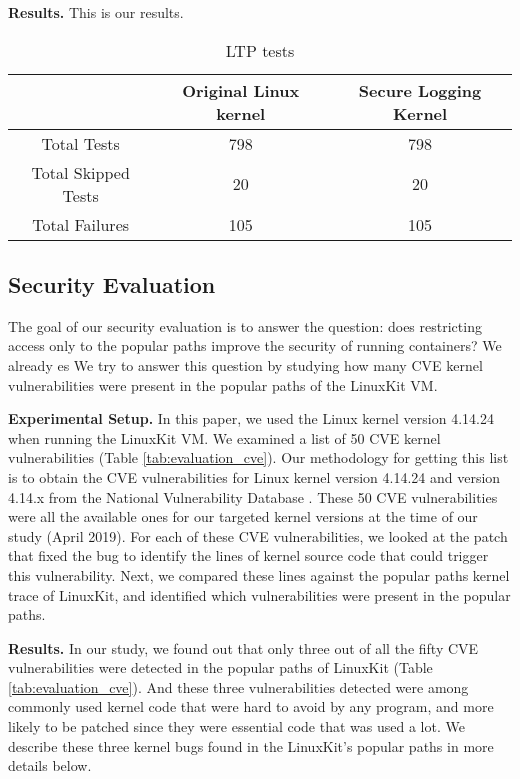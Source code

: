 \textbf{Results.}
This is our results.

\begin{table}[h!]
\begin{center}
\caption{LTP tests}
\label{tab:evaluation_ltp_results}
\begin{tabular}{c|c|c}
 & Original Linux kernel & Secure Logging Kernel \\
 \hline
 Total Tests & 798 & 798 \\
 \hline
 Total Skipped Tests & 20 & 20 \\
 \hline
 Total Failures & 105 & 105 \\
 
\end{tabular}
\end{center}
\end{table}

\subsection{Security Evaluation}
\label{sec.evaluation.security} 
The goal of our security evaluation is to answer the question: does restricting access only to the popular paths improve the security of running containers? 
We already es
We try to answer this question by studying how many CVE kernel vulnerabilities were present in the popular paths of the LinuxKit VM. 

\textbf{Experimental Setup.}
In this paper, we used the Linux kernel version 4.14.24 when running the LinuxKit VM. 
We examined a list of 50 CVE kernel vulnerabilities (Table \ref{tab:evaluation_cve}). 
Our methodology for getting this list is to obtain the CVE vulnerabilities for Linux kernel version 4.14.24 and version 4.14.x from the National Vulnerability Database \cite{NVD}. 
These 50 CVE vulnerabilities were all the available ones for our targeted kernel versions at the time of our study (April 2019). 
For each of these CVE vulnerabilities, we looked at the patch that fixed the bug to identify the lines of kernel source code that could trigger this vulnerability. 
Next, we compared these lines against the popular paths kernel trace of LinuxKit, and identified which vulnerabilities were present in the popular paths. 

\textbf{Results.}
In our study, we found out that only three out of all the fifty CVE vulnerabilities were detected in the popular paths of LinuxKit (Table \ref{tab:evaluation_cve}). 
And these three vulnerabilities detected were among commonly used kernel code that were hard to avoid by any program, and more likely to be patched since they were essential code that was used a lot. 
We describe these three kernel bugs found in the LinuxKit's popular paths in more details below.  

